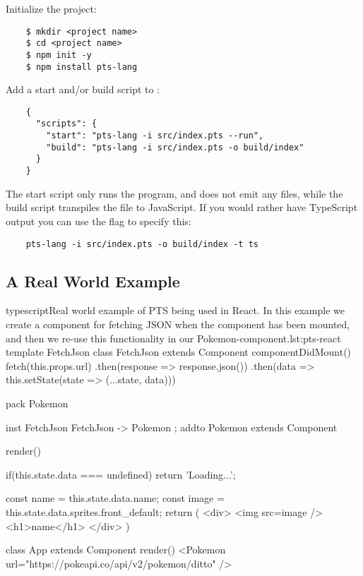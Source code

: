 Initialize the project:

\begin{verbatim}
    $ mkdir <project name>
    $ cd <project name>
    $ npm init -y
    $ npm install pts-lang
\end{verbatim}

Add a start and/or build script to :

\begin{verbatim}
    {
      "scripts": {
        "start": "pts-lang -i src/index.pts --run",
        "build": "pts-lang -i src/index.pts -o build/index"
      }
    }
\end{verbatim}

The start script only runs the program, and does not emit any files, while the build script transpiles the  file to JavaScript.
If you would rather have TypeScript output you can use the  flag to specify this:

\begin{verbatim}
    pts-lang -i src/index.pts -o build/index -t ts
\end{verbatim}

\subsection{A Real World Example}\label{subsec:a-real-world-example}


\begin{code}{typescript}{Real world example of PTS being used in React. In this example we create a component for fetching JSON when the component has been mounted, and then we re-use this functionality in our Pokemon-component.}{lst:pts-react}
    template FetchJson {
        class FetchJson extends Component {
            componentDidMount() {
                fetch(this.props.url)
                .then(response => response.json())
                .then(data =>
                this.setState(state => ({...state, data})))
            }
        }
    }

    pack Pokemon {
        inst FetchJson { FetchJson -> Pokemon };
        addto Pokemon extends Component {
            render() {
                if(this.state.data === undefined)
                return 'Loading...';

                const name = this.state.data.name;
                const image = this.state.data.sprites.front_default;
                return (
                <div>
                <img src={image} />
                <h1>{name}</h1>
                </div>
                )
            }
        }

        class App extends Component {
            render() {
                <Pokemon
                url="https://pokeapi.co/api/v2/pokemon/ditto" />
            }
        }
    }
\end{code}

